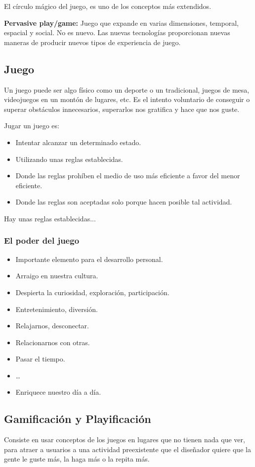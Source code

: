 \documentclass[12pt, twoside, openright]{report} %
\begin{document}
El círculo mágico del juego, es uno de los conceptos más extendidos.

\textbf{Pervasive play/game:} Juego que expande en varias dimensiones, temporal, espacial y social. No es nuevo. Las nuevas tecnologías proporcionan nuevas maneras de producir nuevos tipos de experiencia de juego.

\subsection{Juego}

Un juego puede ser algo físico como un deporte o un tradicional, juegos de mesa, videojuegos en un montón de lugares, etc. Es el intento voluntario de conseguir o superar obstáculos innecesarios, superarlos nos gratifica y hace que nos guste.

Jugar un juego es:
\begin{itemize}
	\item Intentar alcanzar un determinado estado.
	\item Utilizando unas reglas establecidas.
	\item Donde las reglas prohíben el medio de uso más eficiente a favor del menor eficiente.
	\item Donde las reglas son aceptadas solo porque hacen posible tal actividad.
\end{itemize}
Hay unas reglas establecidas...

\subsubsection{El poder del juego}
\begin{itemize}
	\item Importante elemento para el desarrollo personal.
	\item Arraigo en nuestra cultura.
	\item Despierta la curiosidad, exploración, participación.
	\item Entretenimiento, diversión.
	\item Relajarnos, desconectar.
	\item Relacionarnos con otras.
	\item Pasar el tiempo.
	\item \dots
	\item Enriquece nuestro día a día.

\end{itemize}

\subsection{Gamificación y Playificación}
Consiste en usar conceptos de los juegos en lugares que no tienen nada que ver, para atraer a usuarios a una actividad preexistente que el diseñador quiere que la gente le guste más, la haga más o la repita más.
\end{document}
